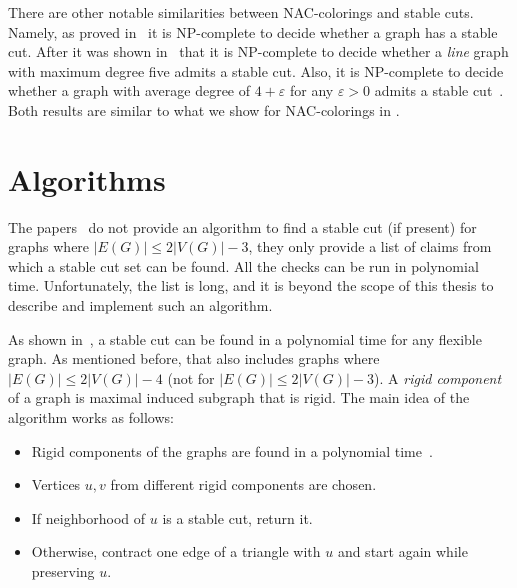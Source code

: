 There are other notable similarities between NAC-colorings and stable cuts.
Namely, as proved in~\cite{stable_cuts_complexity_base} it is NP-complete
to decide whether a graph has a stable cut.
After it was shown in~\cite{stable_cuts_complexity_deg_five} that
it is NP-complete to decide whether a \emph{line} graph with maximum degree five
admits a stable cut.
%
Also, it is NP-complete to decide whether a graph with average degree of
$4+\varepsilon$ for any $\varepsilon > 0$ admits a stable cut~\cite{stable_cuts_complexity_deg_five}.
Both results are similar to what we show for NAC-colorings in .
%

\section{Algorithms}%
\label{sec:stable_cut_algo}

The papers~\cite{stable_cuts_2v_3,stable_cuts_2v_3_revisit} do not provide
an algorithm to find a stable cut (if present)
for graphs where \(|E(G)| \le 2|V(G)|-3 \),
they only provide a list of claims
from which a stable cut set can be found.
All the checks can be run in polynomial time.
Unfortunately, the list is long,
and it is beyond the scope of this thesis
to describe and implement such an algorithm.

As shown in~\cite[Algorithm 1]{stable_cuts_legersky}, a stable cut can be found
in a polynomial time for any flexible graph.
As mentioned before, that also includes graphs
where \( |E(G)| \le 2|V(G)| - 4 \) (not for \( |E(G)| \le 2|V(G)| - 3 \)).
A \emph{rigid component} of a graph is maximal induced subgraph that is rigid.
The main idea of the algorithm works as follows:
%
\begin{itemize}
	\item Rigid components of the graphs are found in a polynomial time~\cite{rigid_components_pebble_game}.
	\item Vertices \( u, v \) from different rigid components are chosen.
	\item If neighborhood of \( u \) is a stable cut, return it.
	\item Otherwise, contract one edge of a triangle with \( u \) and start again while preserving \( u \).
\end{itemize}

